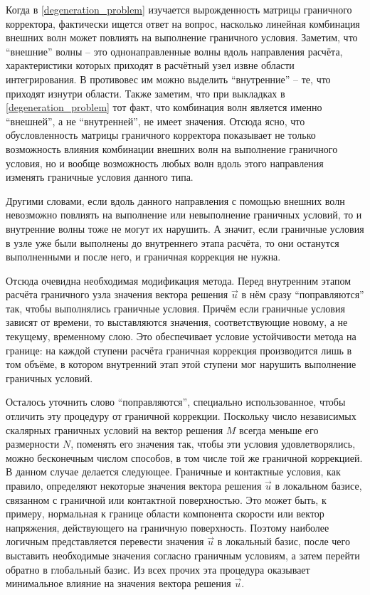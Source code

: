 \documentclass[a4paper]{article}
\numberwithin{equation}{section}
\begin{document}
Когда в \ref{degeneration_problem} изучается вырожденность матрицы 
граничного корректора, фактически ищется ответ на вопрос, насколько линейная 
комбинация внешних волн может повлиять на выполнение граничного условия. 
Заметим, что ``внешние'' волны -- это однонаправленные волны вдоль направления расчёта, 
характеристики которых приходят в расчётный узел извне области интегрирования. 
В противовес им можно выделить ``внутренние'' -- те, что приходят изнутри области.
Также заметим, что при выкладках в \ref{degeneration_problem} тот факт, что комбинация 
волн является именно ``внешней'', а не ``внутренней'', не имеет значения. 
Отсюда ясно, что обусловленность матрицы граничного корректора показывает не только 
возможность влияния комбинации внешних волн на выполнение граничного условия, но и 
вообще возможность любых волн вдоль этого направления изменять граничные условия данного типа. 

Другими словами, если вдоль данного направления 
с помощью внешних волн невозможно повлиять на выполнение или невыполнение 
граничных условий, то и внутренние волны тоже не могут их нарушить.
А значит, если граничные условия в узле уже были выполнены до внутреннего этапа расчёта, то 
они останутся выполненными и после него, и граничная коррекция не нужна.

Отсюда очевидна необходимая модификация метода. Перед внутренним этапом расчёта 
граничного узла значения вектора решения $\vec{u}$ в нём сразу ``поправляются'' так, чтобы выполнялись 
граничные условия. Причём если граничные условия зависят от времени, то выставляются 
значения, соответствующие новому, а не текущему, временному слою. Это обеспечивает условие 
устойчивости метода на границе: на каждой ступени расчёта граничная коррекция производится лишь в том 
объёме, в котором внутренний этап этой ступени мог нарушить выполнение граничных условий.

Осталось уточнить слово ``поправляются'', специально использованное, 
чтобы отличить эту процедуру от граничной коррекции. 
Поскольку число независимых скалярных граничных условий на вектор решения $M$
всегда меньше его размерности $N$, поменять его значения так, чтобы эти условия  
удовлетворялись, можно бесконечным числом способов, 
в том числе той же граничной коррекцией. В данном случае делается следующее. 
Граничные и контактные условия, как правило, определяют некоторые значения 
вектора решения $\vec{u}$ в локальном базисе, связанном с граничной или контактной поверхностью. 
Это может быть, к примеру, нормальная к границе области компонента скорости или 
вектор напряжения, действующего на граничную поверхность. Поэтому наиболее логичным 
представляется перевести значения $\vec{u}$ в локальный базис, после чего 
выставить необходимые значения согласно граничным условиям, а затем перейти 
обратно в глобальный базис. Из всех прочих эта процедура 
оказывает минимальное влияние на значения вектора решения $\vec{u}$. 
\end{document}

